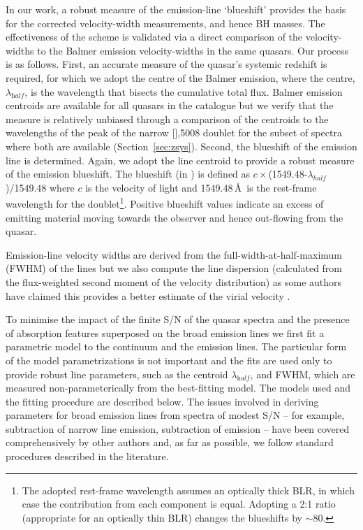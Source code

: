 In our work, a robust measure of the  emission-line `blueshift' provides the basis for the corrected  velocity-width measurements, and hence BH masses.
The effectiveness of the scheme is validated via a direct comparison of the  velocity-widths to the Balmer emission velocity-widths in the same quasars. 
Our process is as follows. 
First, an accurate measure of the quasar's systemic redshift is required, for which we adopt the centre of the Balmer emission, where the centre, $\lambda_{\mathrm half}$, is the wavelength that bisects the cumulative total flux. 
Balmer emission centroids are available for all quasars in the catalogue but we verify that the measure is relatively unbiased through a comparison of the centroids to the wavelengths of the peak of the narrow [],5008 doublet for the subset of spectra where both are available (Section~\ref{sec:zsys}). 
Second, the blueshift of the  emission line is determined. 
Again, we adopt the line centroid to provide a robust measure of the  emission blueshift.
The blueshift (in \kms) is defined as $c\times$(1549.48-$\lambda_{half}$)/1549.48 where $c$ is the velocity of light and 1549.48\,\AA \ is the rest-frame wavelength for the  doublet\footnote{The adopted  rest-frame wavelength assumes an optically thick BLR, in which case the contribution from each component is equal. Adopting a 2:1 ratio (appropriate for an optically thin BLR) changes the blueshifts by $\sim$80\kms.}. 
Positive blueshift values indicate an excess of emitting material moving towards the observer and hence out-flowing from the quasar. 

Emission-line velocity widths are derived from the full-width-at-half-maximum (FWHM) of the lines but we also compute the line dispersion (calculated from the flux-weighted second moment of the velocity distribution) as some authors have claimed this provides a better estimate of the virial velocity \citep{denney13}. 

To minimise the impact of the finite S/N of the quasar spectra and the presence of absorption features superposed on the broad emission lines we first fit a parametric model to the continuum and the emission lines. 
The particular form of the model parametrizations is not important and the fits are used only to provide robust line parameters, such as the centroid $\lambda_{\mathrm half}$, and FWHM, which are measured non-parameterically from the best-fitting model. 
The models used and the fitting procedure are described below. 
The issues involved in deriving parameters for broad emission lines from spectra of modest S/N -- for example, subtraction of narrow line emission, subtraction of  emission -- have been covered comprehensively by other authors \citep[e.g.][]{shen11,shen12,denney13,shen16a} and, as far as possible, we follow standard procedures described in the literature. 

